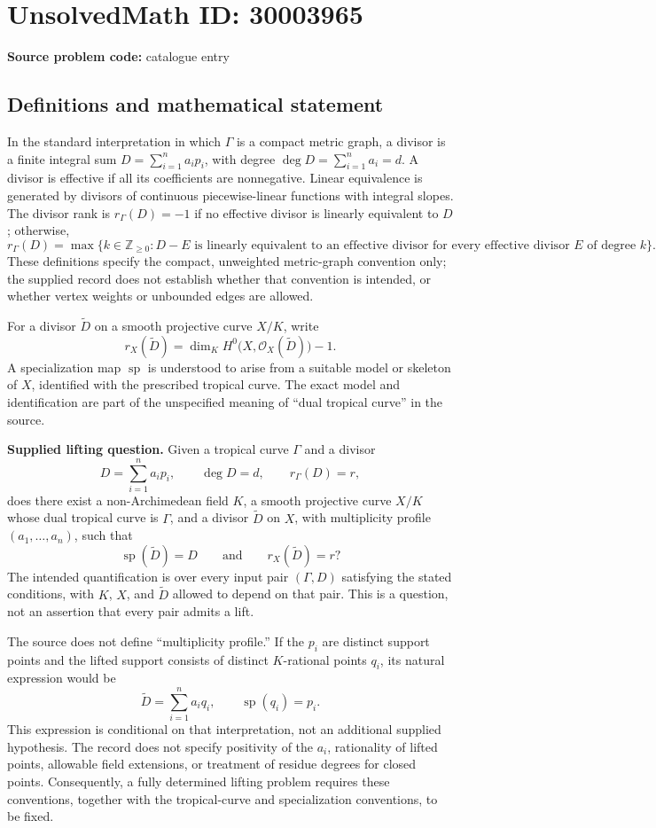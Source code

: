 \documentclass[11pt]{article}
\newcommand{\Z}{\mathbb{Z}}
\begin{document}
\section*{UnsolvedMath ID: 30003965}
\textbf{Source problem code:} catalogue entry
\subsection{Definitions and mathematical statement}
In the standard interpretation in which \(\Gamma\) is a compact metric graph, a divisor is a finite integral sum \(D=\sum_{i=1}^{n}a_i p_i\), with degree \(\deg D=\sum_{i=1}^{n}a_i=d\). A divisor is effective if all its coefficients are nonnegative. Linear equivalence is generated by divisors of continuous piecewise-linear functions with integral slopes. The divisor rank is \(r_\Gamma(D)=-1\) if no effective divisor is linearly equivalent to \(D\); otherwise,
\[
r_\Gamma(D)=\max\bigl\{k\in\Z_{\geq0}: D-E\text{ is linearly equivalent to an effective divisor for every effective divisor }E\text{ of degree }k\bigr\}.
\]
These definitions specify the compact, unweighted metric-graph convention only; the supplied record does not establish whether that convention is intended, or whether vertex weights or unbounded edges are allowed.

For a divisor \(\widetilde D\) on a smooth projective curve \(X/K\), write
\[
r_X(\widetilde D)=\dim_K H^0\bigl(X,\mathcal O_X(\widetilde D)\bigr)-1.
\]
A specialization map \(\operatorname{sp}\) is understood to arise from a suitable model or skeleton of \(X\), identified with the prescribed tropical curve. The exact model and identification are part of the unspecified meaning of ``dual tropical curve'' in the source.

\textbf{Supplied lifting question.} Given a tropical curve \(\Gamma\) and a divisor
\[
D=\sum_{i=1}^{n}a_i p_i,\qquad \deg D=d,\qquad r_\Gamma(D)=r,
\]
does there exist a non-Archimedean field \(K\), a smooth projective curve \(X/K\) whose dual tropical curve is \(\Gamma\), and a divisor \(\widetilde D\) on \(X\), with multiplicity profile \((a_1,\ldots,a_n)\), such that
\[
\operatorname{sp}(\widetilde D)=D
\qquad\text{and}\qquad
r_X(\widetilde D)=r?
\]
The intended quantification is over every input pair \((\Gamma,D)\) satisfying the stated conditions, with \(K\), \(X\), and \(\widetilde D\) allowed to depend on that pair. This is a question, not an assertion that every pair admits a lift.

The source does not define ``multiplicity profile.'' If the \(p_i\) are distinct support points and the lifted support consists of distinct \(K\)-rational points \(q_i\), its natural expression would be
\[
\widetilde D=\sum_{i=1}^{n}a_i q_i,\qquad \operatorname{sp}(q_i)=p_i.
\]
This expression is conditional on that interpretation, not an additional supplied hypothesis. The record does not specify positivity of the \(a_i\), rationality of lifted points, allowable field extensions, or treatment of residue degrees for closed points. Consequently, a fully determined lifting problem requires these conventions, together with the tropical-curve and specialization conventions, to be fixed.
\end{document}
